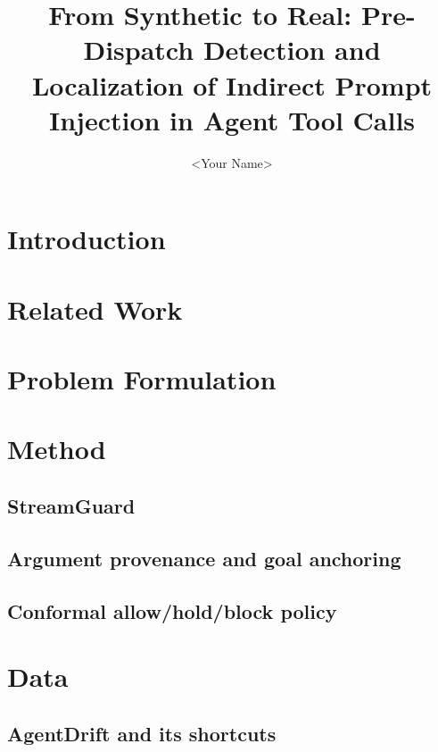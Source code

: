 \documentclass[11pt]{article}
\title{From Synthetic to Real: Pre-Dispatch Detection and Localization of Indirect Prompt Injection in Agent Tool Calls}
\author{<Your Name>}
\date{}
\begin{document}
\maketitle

\begin{abstract}
\end{abstract}

\section{Introduction}

\section{Related Work}

\section{Problem Formulation}

\section{Method}
\subsection{StreamGuard}
\subsection{Argument provenance and goal anchoring}
\subsection{Conformal allow/hold/block policy}

\section{Data}
\subsection{AgentDrift and its shortcuts}
\end{document}
